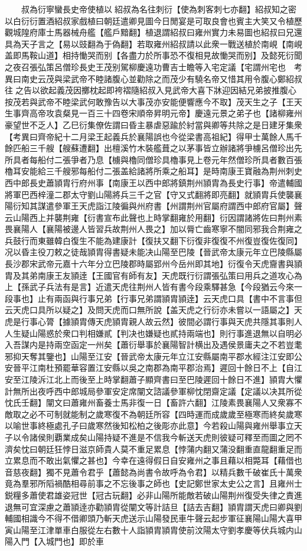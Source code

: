 　　叔為衍寧蠻長史帝使植以紹叔為名往刺衍【使為刺客刺七亦翻】紹叔知之密以白衍衍置酒紹叔家戲植曰朝廷遣卿見圖今日閒宴是可取良會也賓主大笑又令植歷觀城隍府庫士馬器械舟艦【艦戶黯翻】植退謂紹叔曰雍州實力未易圖也紹叔曰兄還具為天子言之【易以豉翻為于偽翻】若取雍州紹叔請以此衆一戰送植於南峴【南峴盖即馬鞍山道】相持慟哭而别【各盡力於所事恐不復相見故慟哭而别】及懿死衍聞之夜召張弘策呂僧珍長史王茂别駕柳慶遠功曹吉士瞻等入宅定議【宅謂州宅也　考異曰南史云茂與梁武帝不睦諸腹心並勸除之而茂少有驍名帝又惜其用令腹心鄭紹叔往之告以欲起義茂因擲枕起即袴褶隨紹叔入見武帝大喜下牀迎因結兄弟披推腹心按茂若與武帝不睦梁武何敢豫告以大事茂亦安能便響應今不取】茂天生之子【王天生事齊高帝攻袁粲見一百三十四卷宋順帝昇明元帝】慶遠元景之弟子也【諸柳雍州豪望世不乏人】乙巳衍集僚佐謂曰昏主暴虐惡踰於紂當與卿等共除之是日建牙集衆　【考異曰齊帝紀十二月梁王起義兵於襄陽誤也今從梁書高祖紀】得甲士萬餘人馬千餘匹船三千艘【艘蘇遭翻】出檀溪竹木裝艦葺之以茅事皆立辦諸將爭㯭呂僧珍出先所具者每船付二張爭者乃息【㯭與櫓同僧珍具櫓事見上卷元年然僧珍所具者數百張櫓耳安能給三千艘邪每船付二張盖給諸將所乘之船耳】是時南康王寶融為荆州刺史西中郎長史蕭頴胄行府州事【南康王以西中郎將鎮荆州頴胄為長史行事】帝遣輔國將軍巴西梓潼二郡太守劉山陽將兵三千之官【守又式翻將即亮翻】就頴胄兵使襲襄陽衍知其謀遣參軍王天虎詣江陵徧與州府書【州謂荆州官屬府謂西中郎府官屬】聲云山陽西上并襲荆雍【衍書宣布此聲也上時掌翻雍於用翻】衍因謂諸將佐曰荆州素畏襄陽人【襄陽被邊人皆習兵故荆州人畏之】加以脣亡齒寒寧不闇同邪我合荆雍之兵鼓行而東雖韓白復生不能為建康計【復扶又翻下衍復非復復不州復豈復佐復同】况以昏主役刀敕之徒哉頴胄得書疑未能决山陽至巴陵【晉武帝太康元年立巴陵縣屬長沙郡宋武帝元嘉十六年分立巴陵郡時屬郢州今岳州即其地】衍復令天虎齎書與頴胄及其弟南康王友頴逹【王國官有師有友】天虎既行衍謂張弘策曰用兵之道攻心為上【孫武子兵法有是言】近遣天虎往荆州人皆有書今段乘驛甚急【今段猶云今來一段事也】止有兩函與行事兄弟【行事兄弟謂頴胄頴逹】云天虎口具【書中不言事但云天虎口具所以疑之】及問天虎而口無所說【盖天虎之行衍亦未嘗以一語屬之】天虎是行事心膂【據頴胄傳天虎頴胄親人故云然】彼間必謂行事與天虎共隱其事則人人生疑山陽惑於衆口判相嫌貳【判决也嫌疑也貳持兩端也】則行事進退無以自明必入吾謀内是持兩空函定一州矣【蕭衍舉事於襄陽智計横出及遇侯景庸夫之不若豈耄邪抑天奪其鑒也】山陽至江安【晉武帝太康元年立江安縣屬南平郡水經注江安即公安晉平江南杜預罷華容置江安縣以吳之南郡為南平郡治焉】遲回十餘日不上【自江安至江陵泝江北上而後至上時掌翻蕭子顯齊書曰至巴陵遲回十餘日不進】頴胄大懼計無所出夜呼西中郎城局參軍安定席闡文諮議參軍柳忱閉齋定議【定議以决其所從忱氏壬翻】闡文曰蕭雍州畜養士馬非復一日【畜許六翻】江陵素畏襄陽人又衆寡不敵取之必不可制就能制之歲寒復不為朝廷所容【四時運而成歲歲至極寒而終矣歲寒以喻世事終極處孔子曰歲寒然後知松柏之後彫亦此意】今若殺山陽與雍州舉事立天子以令諸侯則覇業成矣山陽持疑不進是不信我今斬送天虎則彼疑可釋至而圖之罔不濟矣忱曰朝廷狂悖日滋京師貴人莫不重足累息【悖蒲内翻又蒲没翻重直龍翻重足而立累息而不敢出氣懼之甚也】今幸在遠得假日自安雍州之事且藉以相斃耳【藉借也音慈夜翻】獨不見蕭令君乎【蕭懿為尚書令故呼為令君】以精兵數千破崔氏十萬衆竟為羣邪所䧟禍酷相尋前事之不忘後事之師也【史記鄭世家太史公之言】且雍州士鋭糧多蕭使君雄姿冠世【冠古玩翻】必非山陽所能敵若破山陽荆州復受失律之責進退無可宜深慮之蕭頴逹亦勸頴胄從闡文等計詰旦【詰去吉翻】頴胄謂天虎曰卿與劉輔國相識今不得不借卿頭乃斬天虎送示山陽發民車牛聲云起步軍征襄陽山陽大喜甲寅山陽至江津單車白服從左右數十人詣頴胄頴胄使前汶陽太守劉孝慶等伏兵城内山陽入門【入城門也】即於車